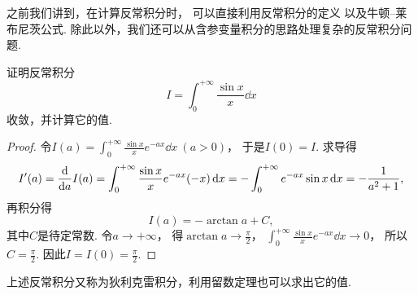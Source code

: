 之前我们讲到，在计算反常积分时，
可以直接利用反常积分的定义
以及牛顿--莱布尼茨公式.
除此以外，我们还可以从含参变量积分的思路处理复杂的反常积分问题.

\begin{example}
证明反常积分\[
	I = \int_0^{+\infty} \frac{\sin x}{x} \dd{x}
\]收敛，并计算它的值.
\begin{proof}
令\(I(a) = \int_0^{+\infty} \frac{\sin x}{x} e^{-ax} \dd{x}\ (a>0)\)，
于是\(I(0) = I\).
求导得\[
	I'(a) = \dv{a} I(a)
	= \int_0^{+\infty} \frac{\sin x}{x} e^{-ax} (-x) \dd{x}
	= - \int_0^{+\infty} e^{-ax} \sin x \dd{x}
	= - \frac{1}{a^2+1},
\]
再积分得\[
	I(a) = -\arctan a + C,
\]
其中\(C\)是待定常数.
令\(a\to+\infty\)，
得\(\arctan a\to\frac{\pi}{2}\)，
\(\int_0^{+\infty} \frac{\sin x}{x} e^{-ax} \dd{x} \to 0\)，
所以\(C = \frac{\pi}{2}\).
因此\(I = I(0) = \frac{\pi}{2}\).
\end{proof}
\end{example}
上述反常积分又称为狄利克雷积分，利用留数定理也可以求出它的值.
